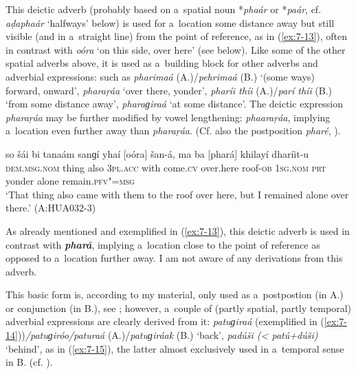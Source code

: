  This deictic adverb (probably based on a~spatial
noun *\textit{phaár} or *\textit{paár}, cf. \textit{aḍaphaár} `halfways' below) is used
for a~location some distance away but still visible (and in a~straight line) from the point of
reference, as in (\ref{ex:7-13}), often in contrast with \textit{oóra} `on this side, over here'
(see below). Like some of the other spatial adverbs above, it is used as a~building block for other
adverbs and adverbial expressions: such as \textit{pharimaá} (A.)/\textit{pehrimaá} (B.)
`(some ways) forward, onward', \textit{pharaṛáa} `over there, yonder', \textit{pharíi
  thíi} (A.)/\textit{parí thíi} (B.) `from some distance away', \textit{pharaɡiraá}
`at some distance'. The deictic expression \textit{pharaṛáa} may be further modified by vowel
lengthening: \textit{phaaraṛáa}, implying a~location even further away than
\textit{pharaṛáa}. (Cf. also the postposition \textit{pharé}, ).

\begin{exe}
\ex
\label{ex:7-13}
\gll so šái bi tanaám sanɡí yhaí [oóra] šan-á, ma ba [phará] khilayí dharíit-u \\
\textsc{dem.msg.nom} thing also \textsc{3pl.acc} with come.\textsc{cv} over.here roof-\textsc{ob} \textsc{1sg.nom} \textsc{prt} yonder alone remain.\textsc{pfv"=msg}\\
\glt `That thing also came with them to the roof over here, but I remained alone over there.' (A:HUA032-3)
\end{exe}

 As already mentioned and exemplified in (\ref{ex:7-13}), this deictic adverb is used in contrast with \textbf{\textit{phará}}, implying a~location close to the point of reference as opposed to a~location further away. I am not aware of any derivations from this adverb. 

 This basic form is, according to my material, only used as a~postpostion (in A.) or conjunction (in B.), see ; however, a~couple of (partly spatial, partly temporal) adverbial expressions are clearly derived from it: \textit{patuɡiraá} (exemplified in (\ref{ex:7-14}))\textit{/patuɡiróo/paturaá} (A.)/\textit{patuɡiráak} (B.) `back', \textit{padúši ({\textless} patú+dúši)} `behind', as in (\ref{ex:7-15}), the latter almost exclusively used in a~temporal sense in B. (cf. ).

